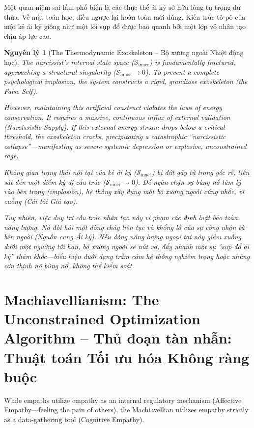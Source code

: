 \documentclass{report}
\newtheorem{nguyenly}{Nguyên lý}
\begin{document}
Một quan niệm sai lầm phổ biến là các thực thể ái kỷ sở hữu lòng tự trọng dư thừa. Về mặt toán học, điều ngược lại hoàn toàn mới đúng. Kiến trúc tô-pô của một kẻ ái kỷ giống như một lõi sụp đổ được bao quanh bởi một lớp vỏ nhân tạo chịu áp lực cao.

\begin{nguyenly}[The Thermodynamic Exoskeleton -- Bộ xương ngoài Nhiệt động học]
	The narcissist's internal state space ($\mathcal{S}_{\text{inner}}$) is fundamentally fractured, approaching a structural singularity ($\mathcal{S}_{\text{inner}} \to 0$). To prevent a complete psychological implosion, the system constructs a rigid, grandiose exoskeleton (the False Self).
	
	However, maintaining this artificial construct violates the laws of energy conservation. It requires a massive, continuous influx of external validation (Narcissistic Supply). If this external energy stream drops below a critical threshold, the exoskeleton cracks, precipitating a catastrophic ``narcissistic collapse''—manifesting as severe systemic depression or explosive, unconstrained rage.
	
	Không gian trạng thái nội tại của kẻ ái kỷ ($\mathcal{S}_{\text{inner}}$) bị đứt gãy từ trong gốc rễ, tiến sát đến một điểm kỳ dị cấu trúc ($\mathcal{S}_{\text{inner}} \to 0$). Để ngăn chặn sự bùng nổ tâm lý vào bên trong (implosion), hệ thống xây dựng một bộ xương ngoài cứng nhắc, vĩ cuồng (Cái tôi Giả tạo).
	
	Tuy nhiên, việc duy trì cấu trúc nhân tạo này vi phạm các định luật bảo toàn năng lượng. Nó đòi hỏi một dòng chảy liên tục và khổng lồ của sự công nhận từ bên ngoài (Nguồn cung Ái kỷ). Nếu dòng năng lượng ngoại tại này giảm xuống dưới một ngưỡng tới hạn, bộ xương ngoài sẽ nứt vỡ, đẩy nhanh một sự ``sụp đổ ái kỷ'' thảm khốc—biểu hiện dưới dạng trầm cảm hệ thống nghiêm trọng hoặc những cơn thịnh nộ bùng nổ, không thể kiểm soát.
\end{nguyenly}

\section{Machiavellianism: The Unconstrained Optimization Algorithm -- Thủ đoạn tàn nhẫn: Thuật toán Tối ưu hóa Không ràng buộc}

While empaths utilize empathy as an internal regulatory mechanism (Affective Empathy—feeling the pain of others), the Machiavellian utilizes empathy strictly as a data-gathering tool (Cognitive Empathy). 
\end{document}
